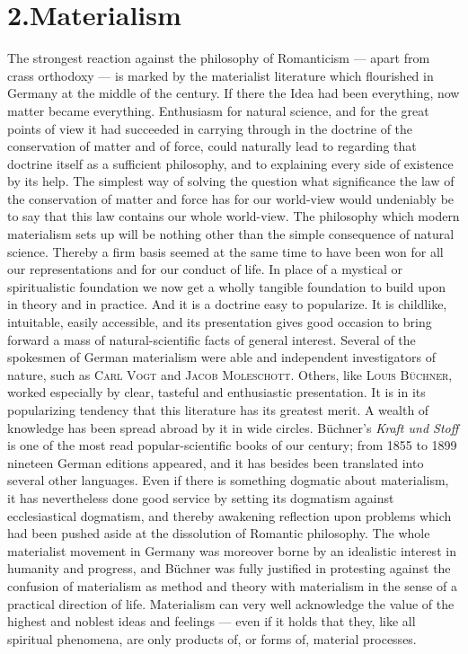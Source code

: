 \documentclass[12pt,a4paper]{book}
\newcommand{\opage}[1]{\marginnote{\footnotesize\textit{[#1]}}}
\begin{document}
\section*{2.\quad Materialism}
\label{sec:materialisme}

The strongest reaction against the philosophy of Romanticism --- apart from
crass orthodoxy --- is marked by the materialist literature which flourished in
Germany at the middle of the century. If there the Idea had been everything, now
matter became everything. Enthusiasm for natural science, and for the great
points of view it had succeeded in carrying through in the doctrine of the
conservation of matter and of force, could naturally lead to regarding that
doctrine itself as a sufficient philosophy, and to explaining every side of
existence by its help. The simplest way of solving the question what
significance the law of the conservation of matter and force has for our
world-view would undeniably be to say that this law contains our whole
world-view. The philosophy which modern materialism sets up will be nothing
other than the simple consequence of natural science. Thereby a firm basis
seemed at the same time to have been won for all our representations and for our
conduct of life. In place of a mystical or \opage{501}spiritualistic foundation we now get
a wholly tangible foundation to build upon in theory and in practice. And it is
a doctrine easy to popularize. It is childlike, intuitable, easily accessible,
and its presentation gives good occasion to bring forward a mass of
natural-scientific facts of general interest. Several of the spokesmen of German
materialism were able and independent investigators of nature, such as
\textsc{Carl Vogt} and \textsc{Jacob Moleschott}. Others, like \textsc{Louis
Büchner}, worked especially by clear, tasteful and enthusiastic presentation. It
is in its popularizing tendency that this literature has its greatest merit. A
wealth of knowledge has been spread abroad by it in wide circles. Büchner's
\textit{Kraft und Stoff} is one of the most read popular-scientific books of our
century; from 1855 to 1899 nineteen German editions appeared, and it has besides
been translated into several other languages. Even if there is something
dogmatic about materialism, it has nevertheless done good service by setting its
dogmatism against ecclesiastical dogmatism, and thereby awakening reflection
upon problems which had been pushed aside at the dissolution of Romantic
philosophy. The whole materialist movement in Germany was moreover borne by an
idealistic interest in humanity and progress, and Büchner was fully justified in
protesting against the confusion of materialism as method and theory with
materialism in the sense of a practical direction of life. Materialism can very
well acknowledge the value of the highest and noblest ideas and feelings ---
even if it holds that they, like all spiritual phenomena, are only products of,
or forms of, material processes.
\end{document}
